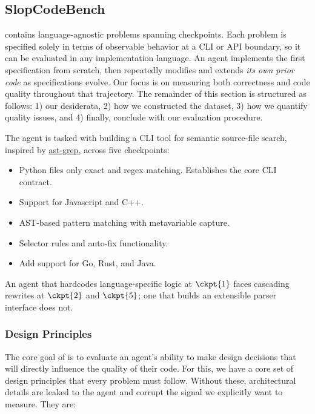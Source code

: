 \subsection{SlopCodeBench}
\label{sec:benchmark}

\scb{} contains \transProblems{} language-agnostic problems spanning \overallTotalCheckpoints{} checkpoints. Each problem is specified solely in terms of observable behavior at a CLI or API boundary, so it can be evaluated in any implementation language. An agent implements the first specification from scratch, then repeatedly modifies and extends \emph{its own prior code} as specifications evolve. Our focus is on measuring both correctness and code quality throughout that trajectory. The remainder of this section is structured as follows: 1) our desiderata, 2) how we constructed the dataset, 3) how we quantify quality issues, and 4) finally, conclude with our evaluation procedure. 

\begin{runningexample}
\label{sec:running-example}
The agent is tasked with building a CLI tool for semantic source-file search, inspired by \href{https://ast-grep.github.io}{ast-grep}, across five checkpoints:
\begin{itemize}
    \item[$\ckpt{1}$ -] Python files only exact and regex matching. Establishes the core CLI contract.
    \item[$\ckpt{2}$ -] Support for Javascript and C++.
    \item[$\ckpt{3}$ -] AST-based pattern matching with metavariable capture.
    \item[$\ckpt{4}$ -] Selector rules and auto-fix functionality.
    \item[$\ckpt{5}$ -] Add support for Go, Rust, and Java.
\end{itemize}

An agent that hardcodes language-specific logic at $\ckpt{1}$ faces cascading rewrites at $\ckpt{2}$ and $\ckpt{5}$; one that builds an extensible parser interface does not.
\end{runningexample}
\subsubsection{Design Principles}\label{sec:design-principles}

The core goal of \scb{} is to evaluate an agent's ability to make design decisions that will directly influence the quality of their code. For this, we have a core set of design principles that every problem must follow. Without these, architectural details are leaked to the agent and corrupt the signal we explicitly want to measure. They are:

